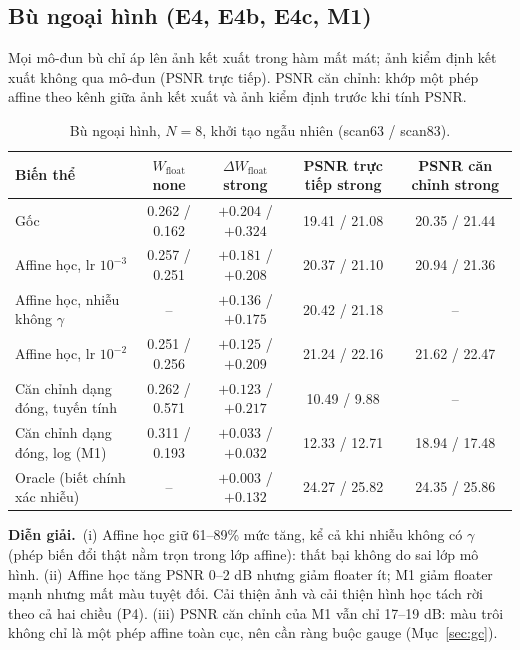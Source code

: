 \documentclass[11pt,a4paper]{article}
\newcommand{\W}{W_{\text{float}}}
\newcommand{\dW}{\Delta W_{\text{float}}}
\newcommand{\interp}{\par\smallskip\noindent\textbf{Diễn giải.}~}
\begin{document}
\subsection{Bù ngoại hình (E4, E4b, E4c, M1)}
\label{sec:comp}
Mọi mô-đun bù chỉ áp lên ảnh kết xuất trong hàm mất mát; ảnh kiểm định kết xuất không qua mô-đun (PSNR trực tiếp). PSNR căn chỉnh: khớp một phép affine theo kênh giữa ảnh kết xuất và ảnh kiểm định trước khi tính PSNR.
\begin{table}[H]
\centering\small
\caption{Bù ngoại hình, $N=8$, khởi tạo ngẫu nhiên (scan63 / scan83).}
\begin{tabular}{@{}lcccc@{}}
\toprule
Biến thể & $\W$ none & $\dW$ strong & PSNR trực tiếp strong & PSNR căn chỉnh strong \\
\midrule
Gốc & 0.262 / 0.162 & $+0.204$ / $+0.324$ & 19.41 / 21.08 & 20.35 / 21.44 \\
Affine học, lr $10^{-3}$ & 0.257 / 0.251 & $+0.181$ / $+0.208$ & 20.37 / 21.10 & 20.94 / 21.36 \\
Affine học, nhiễu không $\gamma$ & -- & $+0.136$ / $+0.175$ & 20.42 / 21.18 & -- \\
Affine học, lr $10^{-2}$ & 0.251 / 0.256 & $+0.125$ / $+0.209$ & 21.24 / 22.16 & 21.62 / 22.47 \\
Căn chỉnh dạng đóng, tuyến tính & 0.262 / 0.571 & $+0.123$ / $+0.217$ & 10.49 / 9.88 & -- \\
Căn chỉnh dạng đóng, log (M1) & 0.311 / 0.193 & $+0.033$ / $+0.032$ & 12.33 / 12.71 & 18.94 / 17.48 \\
Oracle (biết chính xác nhiễu) & -- & $+0.003$ / $+0.132$ & 24.27 / 25.82 & 24.35 / 25.86 \\
\bottomrule
\end{tabular}
\end{table}
\interp (i) Affine học giữ 61--89\% mức tăng, kể cả khi nhiễu không có $\gamma$ (phép biến đổi thật nằm trọn trong lớp affine): thất bại không do sai lớp mô hình. (ii) Affine học tăng PSNR 0--2 dB nhưng giảm floater ít; M1 giảm floater mạnh nhưng mất màu tuyệt đối. Cải thiện ảnh và cải thiện hình học tách rời theo cả hai chiều (P4). (iii) PSNR căn chỉnh của M1 vẫn chỉ 17--19 dB: màu trôi không chỉ là một phép affine toàn cục, nên cần ràng buộc gauge (Mục~\ref{sec:gc}).
\end{document}
